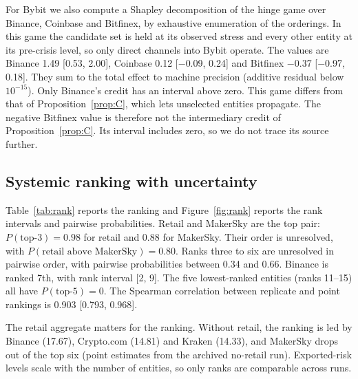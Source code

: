 \documentclass[referee,pdflatex,sn-mathphys-ay]{sn-jnl}
\theoremstyle{thmstyleone}%
\theoremstyle{thmstyletwo}%
\theoremstyle{thmstylethree}%
\begin{document}
For Bybit we also compute a Shapley decomposition of the hinge game over Binance, Coinbase and Bitfinex, by exhaustive
enumeration of the orderings. In this game the candidate set is held at its observed stress and every other entity at its
pre-crisis level, so only direct channels into Bybit operate. The values are Binance 1.49 [0.53, 2.00],
Coinbase 0.12 [$-$0.09, 0.24] and Bitfinex $-$0.37 [$-$0.97, 0.18]. They sum to the
total effect to machine precision (additive residual below $10^{-15}$). Only Binance's credit has an interval above zero.
This game differs from that of Proposition~\ref{prop:C}, which lets unselected entities propagate. The negative Bitfinex
value is therefore not the intermediary credit of Proposition~\ref{prop:C}. Its interval includes zero, so we do not trace
its source further.

\subsection{Systemic ranking with uncertainty}
\label{subsec:ranking}
Table~\ref{tab:rank} reports the ranking and Figure~\ref{fig:rank} reports the rank intervals and pairwise probabilities.
Retail and MakerSky are the top pair: $P(\text{top-3})=0.98$ for retail and $0.88$ for MakerSky. Their
order is unresolved, with $P(\text{retail above MakerSky})=0.80$. Ranks three to six are unresolved in
pairwise order, with pairwise probabilities between 0.34 and 0.66. Binance is ranked 7th, with rank interval [2, 9]. The five
lowest-ranked entities (ranks 11--15) all have $P(\text{top-5})=0$. The Spearman correlation between replicate and
point rankings is 0.903 [0.793, 0.968].

The retail aggregate matters for the ranking. Without retail, the ranking is led by Binance (17.67), Crypto.com
(14.81) and Kraken (14.33), and MakerSky drops out of the top six
(point estimates from the archived no-retail run). Exported-risk levels scale with the number of entities, so only ranks
are comparable across runs.
\end{document}
